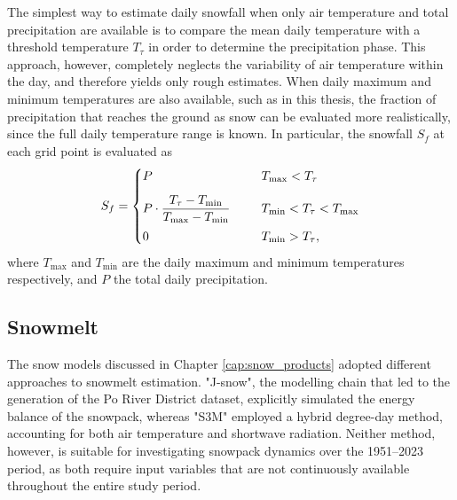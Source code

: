 The simplest way to estimate daily snowfall when only air temperature and total precipitation are available is to compare the mean daily temperature with 
a threshold temperature $T_\tau$ in order to determine the precipitation phase. This approach, however, completely neglects the variability of air 
temperature within the day, and therefore yields only rough estimates. When daily maximum and minimum temperatures are also available, such as in this 
thesis, the fraction of precipitation that reaches the ground as snow can be evaluated more realistically, since the full daily temperature range is known. 
In particular, the snowfall $S_f$ at each grid point is evaluated as 
\begin{equation}
    S_{f} =
    \begin{cases}
        P
            & \hspace*{1.5em} T_{\max} < T_{\tau} \\[8pt]
        P \cdot \dfrac{T_{\tau} - T_{\min}}{T_{\max} - T_{\min}}
            & \hspace*{1.5em} T_{\min} < T_{\tau} < T_{\max} \\[8pt]
        0
            & \hspace*{1.5em} T_{\min} > T_{\tau},
    \end{cases}
    \label{eq:phase_partitioning_SWE_model}
\end{equation}
where $T_{\max}$ and $T_{\min}$ are the daily maximum and minimum temperatures respectively, and $P$ the total daily precipitation.



\subsection{Snowmelt}

The snow models discussed in Chapter \ref{cap:snow_products} adopted different approaches to snowmelt estimation. "J-snow", the modelling chain that led 
to the generation of the Po River District dataset, explicitly simulated the energy balance of the snowpack, whereas "S3M" employed a hybrid degree-day 
method, accounting for both air temperature and shortwave radiation. Neither method, however, is suitable for investigating snowpack dynamics over the 
1951--2023 period, as both require input variables that are not continuously available throughout the entire study period.


